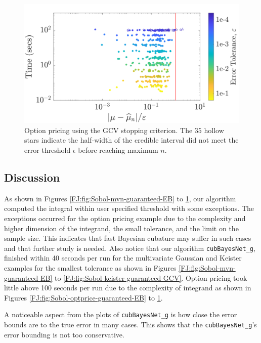 \documentclass[graybox,footinfo]{svmult}
\newcommand{\FJHNote}[1]{{\textcolor{blue}{FJH: #1}}}
\begin{document}
\begin{figure}
\centering
\includegraphics[width=0.95\linewidth]{"figures/Sobol/Sobol_optPrice_guaranteed_time_GCV__d12_r1_2019-Sep-1"}
\caption[Sobol: Option pricing guaranteed: GCV]{Option pricing using the GCV stopping criterion. The $35$ hollow stars indicate the half-width of the credible interval did not meet the error threshold $\epsilon$ before reaching maximum $n$. 
}
\label{FJ:fig:Sobol-optprice-guaranteed-GCV}
\end{figure}




\subsection{Discussion}


As shown in Figures \ref{FJ:fig:Sobol-mvn-guaranteed-EB} to \ref{FJ:fig:Sobol-optprice-guaranteed-GCV}, our algorithm computed the integral within user specified threshold with some exceptions. The exceptions occurred for the  option pricing example due to the complexity and higher dimension of the integrand, the small tolerance, and the limit on the sample size.  This indicates that fast Bayesian cubature may suffer in such cases and that further study is needed. 
Also notice that our algorithm \texttt{cubBayesNet\_g}, finished within 40 seconds per run for the multivariate Gaussian and Keister examples  for the smallest tolerance as shown in Figures \ref{FJ:fig:Sobol-mvn-guaranteed-EB} to \ref{FJ:fig:Sobol-keister-guaranteed-GCV}. Option pricing took little above 100 seconds per run due to the complexity of integrand as shown in Figures \ref{FJ:fig:Sobol-optprice-guaranteed-EB} to \ref{FJ:fig:Sobol-optprice-guaranteed-GCV}.

A  noticeable aspect from the plots of \texttt{cubBayesNet\_g} is how close the error bounds are to the true error in many cases. 
This shows that the \texttt{cubBayesNet\_g}'s error bounding is not too conservative.
\end{document}
